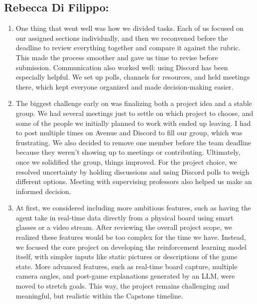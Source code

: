 \documentclass{article}
\begin{document}
\subsection*{Rebecca Di Filippo:}\label{subsec:rebecca-difilippo-reflection}
\begin{enumerate}
    \item
    One thing that went well was how we divided tasks. Each of us focused on our assigned sections individually, and then we reconvened before the deadline to review everything together and compare it against the rubric. This made the process smoother and gave us time to revise before submission. Communication also worked well: using Discord has been especially helpful. We set up polls, channels for resources, and held meetings there, which kept everyone organized and made decision-making easier.
    \item 
    The biggest challenge early on was finalizing both a project idea and a stable group. We had several meetings just to settle on which project to choose, and some of the people we initially planned to work with ended up leaving. I had to post multiple times on Avenue and Discord to fill our group, which was frustrating. We also decided to remove one member before the team deadline because they weren’t showing up to meetings or contributing. Ultimately, once we solidified the group, things improved. For the project choice, we resolved uncertainty by holding discussions and using Discord polls to weigh different options. Meeting with supervising professors also helped us make an informed decision.
    \item
     
    At first, we considered including more ambitious features, such as having the agent take in 
    real-time data directly from a physical board using smart glasses or a video stream. After 
    reviewing the overall project scope, we realized these features would be too complex for the 
    time we have. Instead, we focused the core project on developing the reinforcement learning model 
    itself, with simpler inputs like static pictures or descriptions of the game state. 
    More advanced features, such as real-time board capture, multiple camera angles, and post-game explanations
     generated by an LLM, were moved to stretch goals. This way, the project remains challenging and meaningful, 
     but realistic within the Capstone timeline.
    
\end{enumerate}
\end{document}
